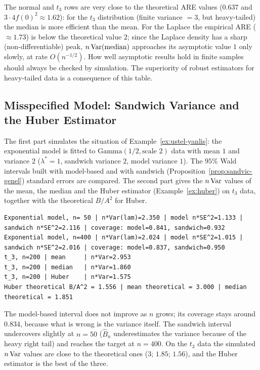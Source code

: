 \documentclass[main.tex]{subfiles}
\begin{document}
The normal and $t_3$ rows are very close to the theoretical ARE values ($0.637$ and $3\cdot4f(0)^2\approx1.62$): for the $t_3$ distribution (finite variance $=3$, but heavy-tailed) the median is more efficient than the mean. For the Laplace the empirical ARE ($\approx1.73$) is below the theoretical value $2$; since the Laplace density has a sharp (non-differentiable) peak, $n\operatorname{Var}(\text{median})$ approaches its asymptotic value $1$ only slowly, at rate $O(n^{-1/2})$. How well asymptotic results hold in finite samples should always be checked by simulation. The superiority of robust estimators for heavy-tailed data is a consequence of this table.

\subsection{Misspecified Model: Sandwich Variance and the Huber Estimator}
The first part simulates the situation of Example~\ref{ex:ustel-yanlis}: the exponential model is fitted to $\text{Gamma}(1/2,\text{scale }2)$ data with mean $1$ and variance $2$ ($\lambda^*=1$, sandwich variance $2$, model variance $1$). The $95\%$ Wald intervals built with model-based and with sandwich (Proposition~\ref{prop:sandvic-genel}) standard errors are compared. The second part gives the $n\operatorname{Var}$ values of the mean, the median and the Huber estimator (Example~\ref{ex:huber}) on $t_3$ data, together with the theoretical $B/A^2$ for Huber.

\begin{lstlisting}[style=output]
Exponential model, n= 50 | n*Var(lam)=2.350 | model n*SE^2=1.133 | sandwich n*SE^2=2.116 | coverage: model=0.841, sandwich=0.932
Exponential model, n=400 | n*Var(lam)=2.024 | model n*SE^2=1.015 | sandwich n*SE^2=2.016 | coverage: model=0.837, sandwich=0.950
t_3, n=200 | mean     | n*Var=2.953
t_3, n=200 | median   | n*Var=1.860
t_3, n=200 | Huber    | n*Var=1.575
Huber theoretical B/A^2 = 1.556 | mean theoretical = 3.000 | median theoretical = 1.851
\end{lstlisting}

The model-based interval does not improve as $n$ grows; its coverage stays around $0.834$, because what is wrong is the variance itself. The sandwich interval undercovers slightly at $n=50$ ($\hat B_n$ underestimates the variance because of the heavy right tail) and reaches the target at $n=400$. On the $t_3$ data the simulated $n\operatorname{Var}$ values are close to the theoretical ones ($3$; $1.85$; $1.56$), and the Huber estimator is the best of the three.
\end{document}
